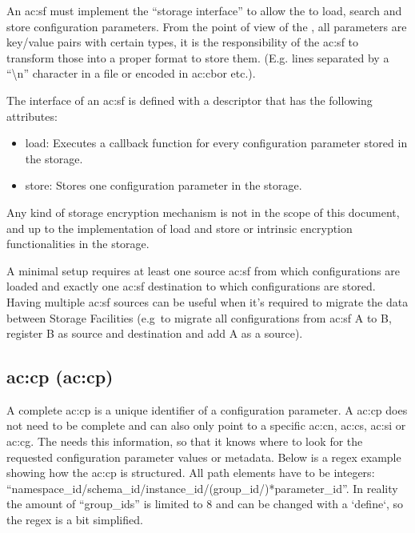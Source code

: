 An \gls{ac:sf} must implement the ``storage interface'' to allow the  to load, search and store configuration parameters.
From the point of view of the , all parameters are key/value pairs with certain types, it is the responsibility of the \gls{ac:sf} to transform those into a proper format to store them.
(E.g. lines separated by a ``\textbackslash{n}'' character in a file or encoded in \gls{ac:cbor} etc.).

The interface of an \gls{ac:sf} is defined with a descriptor that has the following attributes:

\begin{itemize}
    \item load: Executes a callback function for every configuration parameter stored in the storage.

    \item store: Stores one configuration parameter in the storage.
\end{itemize}

Any kind of storage encryption mechanism is not in the scope of this document, and up to the implementation of load and store or intrinsic encryption functionalities in the storage.

A minimal  setup requires at least one source \gls{ac:sf} from which configurations are loaded and exactly one \gls{ac:sf} destination to which configurations are stored.
Having multiple \gls{ac:sf} sources can be useful when it's required to migrate the data between Storage Facilities (e.g\ to migrate all configurations from \gls{ac:sf} A to B, register B as source and destination and add A as a source).

\subsection{\acrlong*{ac:cp} (\acrshort*{ac:cp})}
\label{sec:design:riot_registry:configuration_path}

A complete \gls{ac:cp} is a unique identifier of a configuration parameter.
A \gls{ac:cp} does not need to be complete and can also only point to a specific \gls{ac:cn}, \gls{ac:cs}, \gls{ac:si} or \gls{ac:cg}.
The  needs this information, so that it knows where to look for the requested configuration parameter values or metadata.
Below is a regex example showing how the \gls{ac:cp} is structured.
All path elements have to be integers: ``namespace\_id/schema\_id/instance\_id/(group\_id/)*parameter\_id''.
In reality the amount of ``group\_ids'' is limited to 8 and can be changed with a `define`, so the regex is a bit simplified.

